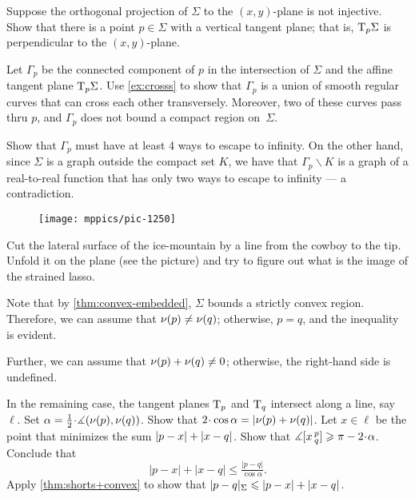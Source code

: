 \begin{multicols}{2}
Suppose the orthogonal projection of $\Sigma$ to the $(x,y)$-plane is not injective.
Show that there is a point $p\in\Sigma$ with a vertical tangent plane;
that is, $\mathrm{T}_p\Sigma$ is perpendicular to the $(x,y)$-plane.

Let $\Gamma_p$ be the connected component of $p$ in the intersection of $\Sigma$ and the affine tangent plane $\mathrm{T}_p\Sigma$.
Use \ref{ex:crosss} to show that $\Gamma_p$ is a union of smooth regular curves that can cross each other transversely.
Moreover, two of these curves pass thru $p$, and $\Gamma_p$ does not bound a compact region on~$\Sigma$.

Show that $\Gamma_p$ must have at least 4 ways to escape to infinity.
On the other hand, since $\Sigma$ is a graph outside the compact set $K$, we have that $\Gamma_p\backslash K$ is a graph of a real-to-real function that has only two ways to escape to infinity --- a contradiction.


\setcounter{eqtn}{0}

\begin{wrapfigure}{r}{24 mm}
\vskip-6mm
\centering
\texttt{[image: mppics/pic-1250]}
\vskip-0mm
\end{wrapfigure}

Cut the lateral surface of the ice-mountain by a line from the cowboy to the tip.
Unfold it on the plane (see the picture) and try to figure out what is the image of the strained lasso.

Note that by \ref{thm:convex-embedded}, $\Sigma$ bounds a strictly convex region.
Therefore, we can assume that $\nu(p)\ne\nu(q)$; otherwise, $p=q$, and the inequality is evident.

Further, we can assume that $\nu(p)+\nu(q)\ne 0$; otherwise, the right-hand side is undefined.

In the remaining case, the tangent planes $\mathrm{T}_p$ and $\mathrm{T}_q$ intersect along a line, say $\ell$.
Set $\alpha=\tfrac12\cdot\measuredangle(\Norm(p),\Norm(q))$.
Show that $2\cdot\cos\alpha\z= |\Norm(p)+\Norm(q)|$.
Let $x\in \ell$ be the point that minimizes the sum $|p-x|\z+|x-q|$.
Show that $\measuredangle\hinge xpq\ge \pi-2\cdot\alpha$.
Conclude that 
\[|p-x|+|x-q|\le \tfrac{|p-q|}{\cos\alpha}.\]
Apply \ref{thm:shorts+convex} to show that
$\dist{p}{q}\Sigma\le |p-x|+|x-q|$.



\end{multicols}
